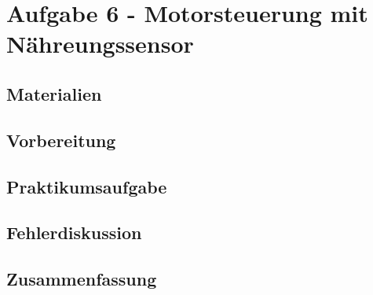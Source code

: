 \section{Aufgabe 6 - Motorsteuerung mit Nähreungssensor}
\label{sec:aufgabe-6---motorsteuerung-mit-nähreungssensor}

\subsection{Materialien}
\label{subsec:a6-materialien}

\subsection{Vorbereitung}
\label{subsec:a6-vorbereitung}

\subsection{Praktikumsaufgabe}
\label{subsec:a6-praktikumsaufgabe}

\subsection{Fehlerdiskussion}
\label{subsec:a6-fehlerdiskussion}

\subsection{Zusammenfassung}
\label{subsec:a6-zusammenfassung}
